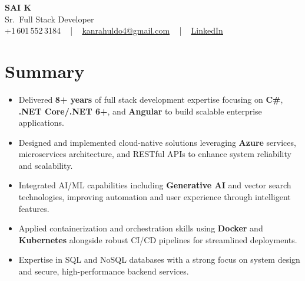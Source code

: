\documentclass[letterpaper,11pt]{article}
\newcommand{\resumeItem}[1]{
  \item\footnotesize{
    {#1 \vspace{-2pt}}
  }
}
\newcommand{\resumeItemListStart}{\begin{itemize}[leftmargin=*]}
\newcommand{\resumeItemListEnd}{\end{itemize}\vspace{-5pt}}
\begin{document}
\begin{center}
    {\fontsize{14pt}{12pt}\selectfont \textbf{\MakeUppercase{Sai K}}}\\ \vspace{2pt}
    \fontsize{10pt}{12pt}\selectfont Sr.\ Full Stack Developer\\ \vspace{2pt}
    \fontsize{10pt}{12pt}\selectfont +1\,601\,552\,3184 ~ | ~
    \href{mailto:kanrahuldo4@gmail.com}{kanrahuldo4@gmail.com} ~ | ~
    \href{https://www.linkedin.com/in/srrrk/}{\color{blue}\underline{LinkedIn}}
    \vspace{-10pt}
\end{center}

\section{Summary}
\fontsize{9pt}{10pt}\selectfont
\resumeItemListStart
  \resumeItem{Delivered \textbf{8+ years} of full stack development expertise focusing on \textbf{C\#}, \textbf{.NET Core/.NET 6+}, and \textbf{Angular} to build scalable enterprise applications.}
  \resumeItem{Designed and implemented cloud-native solutions leveraging \textbf{Azure} services, microservices architecture, and RESTful APIs to enhance system reliability and scalability.}
  \resumeItem{Integrated AI/ML capabilities including \textbf{Generative AI} and vector search technologies, improving automation and user experience through intelligent features.}
  \resumeItem{Applied containerization and orchestration skills using \textbf{Docker} and \textbf{Kubernetes} alongside robust CI/CD pipelines for streamlined deployments.}
  \resumeItem{Expertise in SQL and NoSQL databases with a strong focus on system design and secure, high-performance backend services.}
\resumeItemListEnd
\vspace{-6pt}

\end{document}
